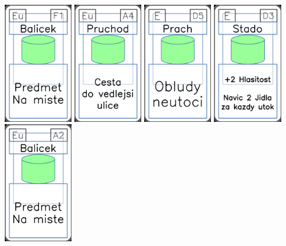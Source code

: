 \documentclass[a4paper]{article}
\begin{document}
	\includegraphics[width=3.0cm]{img-4_25}
	\includegraphics[width=3.0cm]{img-4_33}
	\includegraphics[width=3.0cm]{img-4_49}
	\includegraphics[width=3.0cm]{img-4_47}
	\includegraphics[width=3.0cm]{img-4_31}
\end{document}
